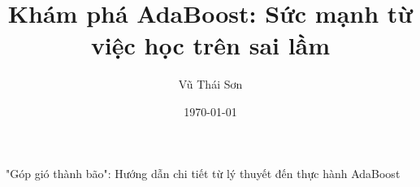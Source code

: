 \documentclass[12pt]{article}
\begin{document}
\title{Khám phá AdaBoost: Sức mạnh từ việc học trên sai lầm}

\author{Vũ Thái Sơn}

\date{\today}

\maketitle

\begin{center}
\large "Góp gió thành bão": Hướng dẫn chi tiết từ lý thuyết đến thực hành AdaBoost
\end{center}





\end{document}
